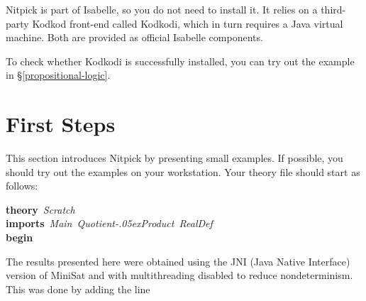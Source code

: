 \documentclass[a4paper,12pt]{article}
\renewcommand\_{\hbox{\textunderscore\kern-.05ex}}
\begin{document}
Nitpick is part of Isabelle, so you do not need to install it. It relies on a
third-party Kodkod front-end called Kodkodi, which in turn requires a Java
virtual machine. Both are provided as official Isabelle components.

%
%
%
%

To check whether Kodkodi is successfully installed, you can try out the example
in \S\ref{propositional-logic}.

\section{First Steps}
\label{first-steps}

This section introduces Nitpick by presenting small examples. If possible, you
should try out the examples on your workstation. Your theory file should start
as follows:

\prew
\textbf{theory}~\textit{Scratch} \\
\textbf{imports}~\textit{Main~Quotient\_Product~RealDef} \\
\textbf{begin}
\postw

The results presented here were obtained using the JNI (Java Native Interface)
version of MiniSat and with multithreading disabled to reduce nondeterminism.
This was done by adding the line
\end{document}
